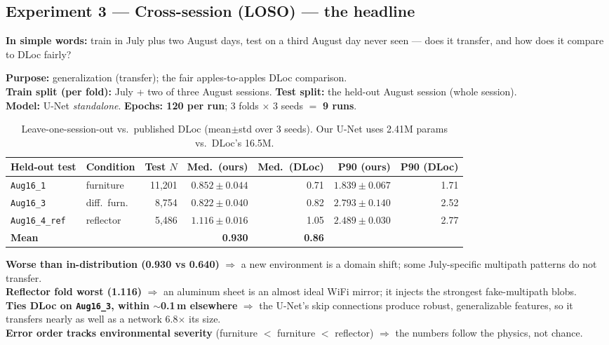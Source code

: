 \documentclass[11pt]{article}
\begin{document}
\subsection{Experiment 3 --- Cross-session (LOSO) --- the headline}
\textbf{In simple words:} train in July plus two August days, test on a third August day never seen ---
does it transfer, and how does it compare to DLoc fairly?

\textbf{Purpose:} generalization (transfer); the fair apples-to-apples DLoc comparison.\\
\textbf{Train split (per fold):} July + two of three August sessions. \quad
\textbf{Test split:} the held-out August session (whole session).\\
\textbf{Model:} U-Net \emph{standalone}. \quad \textbf{Epochs: 120 per run}; 3 folds $\times$ 3 seeds
$=$ \textbf{9 runs}.

\begin{table}[h]
\centering
\footnotesize
\begin{tabular}{@{}llrrrrr@{}}
\toprule
\textbf{Held-out test} & \textbf{Condition} & \textbf{Test $N$} &
\textbf{Med.\ (ours)} & \textbf{Med.\ (DLoc)} & \textbf{P90 (ours)} & \textbf{P90 (DLoc)} \\
\midrule
\texttt{Aug16\_1}     & furniture      & 11{,}201 & $0.852\pm0.044$ & 0.71 & $1.839\pm0.067$ & 1.71 \\
\texttt{Aug16\_3}     & diff.\ furn.   & 8{,}754  & $0.822\pm0.040$ & 0.82 & $2.793\pm0.140$ & 2.52 \\
\texttt{Aug16\_4\_ref}& reflector      & 5{,}486  & $1.116\pm0.016$ & 1.05 & $2.489\pm0.030$ & 2.77 \\
\midrule
\textbf{Mean}         &                &          & \textbf{0.930}  & \textbf{0.86} & & \\
\bottomrule
\end{tabular}
\caption{Leave-one-session-out vs.\ published DLoc (mean$\pm$std over 3 seeds). Our U-Net uses 2.41M
params vs.\ DLoc's 16.5M.}
\end{table}

\begin{whybox}
\textbf{Worse than in-distribution (0.930 vs 0.640)} $\Rightarrow$ a new environment is a domain shift;
some July-specific multipath patterns do not transfer.\\
\textbf{Reflector fold worst (1.116)} $\Rightarrow$ an aluminum sheet is an almost ideal WiFi mirror; it
injects the strongest fake-multipath blobs.\\
\textbf{Ties DLoc on \texttt{Aug16\_3}, within $\sim$0.1\,m elsewhere} $\Rightarrow$ the U-Net's skip
connections produce robust, generalizable features, so it transfers nearly as well as a network
6.8$\times$ its size.\\
\textbf{Error order tracks environmental severity} (furniture $<$ furniture $<$ reflector) $\Rightarrow$
the numbers follow the physics, not chance.
\end{whybox}
\end{document}
